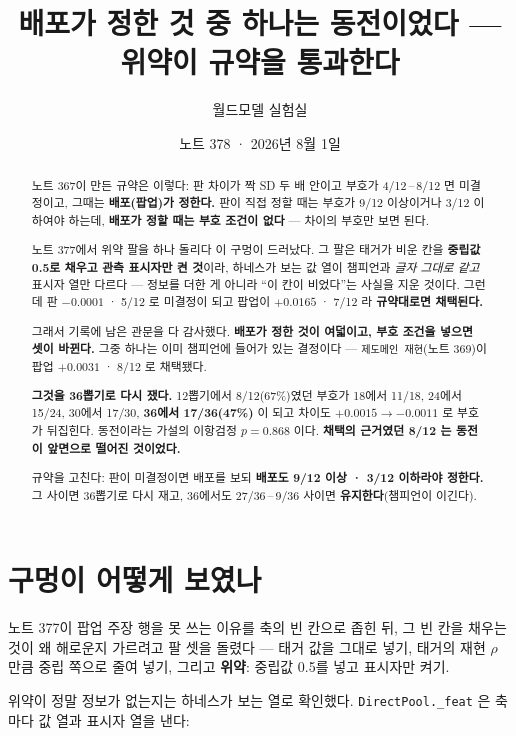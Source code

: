 \documentclass[11pt]{article}
\begin{document}
\title{배포가 정한 것 중 하나는 동전이었다 --- 위약이 규약을 통과한다}
\author{월드모델 실험실}
\date{노트 378 · 2026년 8월 1일}
\maketitle

\begin{abstract}
노트 367이 만든 규약은 이렇다: 판 차이가 짝 SD 두 배 안이고 부호가
4/12\,--\,8/12 면 미결정이고, 그때는 \textbf{배포(팝업)가 정한다.} 판이
직접 정할 때는 부호가 9/12 이상이거나 3/12 이하여야 하는데, \textbf{배포가
정할 때는 부호 조건이 없다} --- 차이의 부호만 보면 된다.

노트 377에서 위약 팔을 하나 돌리다 이 구멍이 드러났다. 그 팔은 태거가
비운 칸을 \textbf{중립값 0.5로 채우고 관측 표시자만 켠 것}이라, 하네스가
보는 값 열이 챔피언과 \emph{글자 그대로 같고} 표시자 열만 다르다 ---
정보를 더한 게 아니라 ``이 칸이 비었다''는 사실을 지운 것이다. 그런데
판 $-0.0001$ · 5/12 로 미결정이 되고 팝업이 $+0.0165$ · 7/12 라
\textbf{규약대로면 채택된다.}

그래서 기록에 남은 관문을 다 감사했다. \textbf{배포가 정한 것이 여덟이고,
부호 조건을 넣으면 셋이 바뀐다.} 그중 하나는 이미 챔피언에 들어가 있는
결정이다 --- \texttt{제도메인 재현}(노트 369)이 팝업 $+0.0031$ · 8/12 로
채택됐다.

\textbf{그것을 36뽑기로 다시 쟀다.} 12뽑기에서 8/12(67\%)였던 부호가 18에서
11/18, 24에서 15/24, 30에서 17/30, \textbf{36에서 17/36(47\%)} 이 되고
차이도 $+0.0015 \to -0.0011$ 로 부호가 뒤집힌다. 동전이라는 가설의 이항검정
$p=0.868$ 이다. \textbf{채택의 근거였던 8/12 는 동전이 앞면으로 떨어진
것이었다.}

규약을 고친다: 판이 미결정이면 배포를 보되 \textbf{배포도 9/12 이상 ·
3/12 이하라야 정한다.} 그 사이면 36뽑기로 다시 재고, 36에서도
27/36\,--\,9/36 사이면 \textbf{유지한다}(챔피언이 이긴다).
\end{abstract}

\section{구멍이 어떻게 보였나}

노트 377이 팝업 주장 행을 못 쓰는 이유를 축의 빈 칸으로 좁힌 뒤, 그
빈 칸을 채우는 것이 왜 해로운지 가르려고 팔 셋을 돌렸다 --- 태거 값을
그대로 넣기, 태거의 재현 $\rho$ 만큼 중립 쪽으로 줄여 넣기, 그리고
\textbf{위약}: 중립값 0.5를 넣고 표시자만 켜기.

위약이 정말 정보가 없는지는 하네스가 보는 열로 확인했다.
\texttt{DirectPool.\_feat} 은 축마다 값 열과 표시자 열을 낸다:
\end{document}
